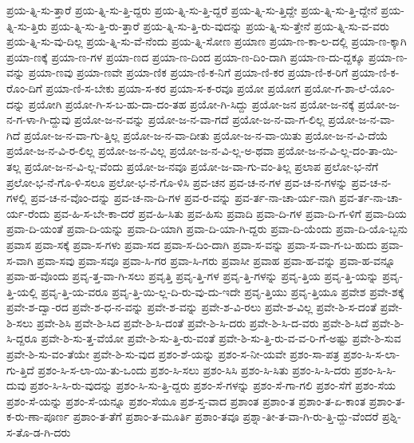 {ಪ್ರಯ-ತ್ನಿ-ಸು-ತ್ತಾರೆ
ಪ್ರಯ-ತ್ನಿ-ಸು-ತ್ತಿ-ದ್ದರು
ಪ್ರಯ-ತ್ನಿ-ಸು-ತ್ತಿ-ದ್ದರೆ
ಪ್ರಯ-ತ್ನಿ-ಸು-ತ್ತಿದ್ದೇ
ಪ್ರಯ-ತ್ನಿ-ಸು-ತ್ತಿ-ದ್ದೇನೆ
ಪ್ರಯ-ತ್ನಿ-ಸು-ತ್ತಿರು
ಪ್ರಯ-ತ್ನಿ-ಸು-ತ್ತಿ-ರು-ತ್ತಾರೆ
ಪ್ರಯ-ತ್ನಿ-ಸು-ತ್ತಿ-ರು-ವುದನ್ನು
ಪ್ರಯ-ತ್ನಿ-ಸು-ತ್ತೇನೆ
ಪ್ರಯ-ತ್ನಿ-ಸು-ವ-ವರು
ಪ್ರಯ-ತ್ನಿ-ಸು-ವು-ದಿಲ್ಲ
ಪ್ರಯ-ತ್ನಿ-ಸು-ವೆ-ನೆಂದು
ಪ್ರಯ-ತ್ನಿ-ಸೋಣ
ಪ್ರಯಾಣ
ಪ್ರಯಾ-ಣ-ಕಾ-ಲ-ದಲ್ಲಿ
ಪ್ರಯಾ-ಣ-ಕ್ಕಾಗಿ
ಪ್ರಯಾ-ಣಕ್ಕೆ
ಪ್ರಯಾ-ಣ-ಗಳ
ಪ್ರಯಾ-ಣದ
ಪ್ರಯಾ-ಣ-ದಿಂದ
ಪ್ರಯಾ-ಣ-ದಿಂ-ದಾಗಿ
ಪ್ರಯಾ-ಣ-ದು-ದ್ದಕ್ಕೂ
ಪ್ರಯಾ-ಣ-ವನ್ನು
ಪ್ರಯಾ-ಣವು
ಪ್ರಯಾ-ಣವೇ
ಪ್ರಯಾ-ಣಿಕ
ಪ್ರಯಾ-ಣಿ-ಕ-ನಿಗೆ
ಪ್ರಯಾ-ಣಿ-ಕರ
ಪ್ರಯಾ-ಣಿ-ಕ-ರಿಗೆ
ಪ್ರಯಾ-ಣಿ-ಕ-ರೊಂ-ದಿಗೆ
ಪ್ರಯಾ-ಣಿ-ಸ-ಬೇಕು
ಪ್ರಯಾ-ಸ-ಕರ
ಪ್ರಯಾ-ಸ-ಕ-ರವೂ
ಪ್ರಯೋ
ಪ್ರಯೋಗ
ಪ್ರಯೋ-ಗ-ಶಾ-ಲೆ-ಯೊಂ-ದನ್ನು
ಪ್ರಯೋಗಿ
ಪ್ರಯೋ-ಗಿ-ಸ-ಬ-ಹು-ದಾ-ದಂ-ತಹ
ಪ್ರಯೋ-ಗಿ-ಸಿದ್ದು
ಪ್ರಯೋ-ಜನ
ಪ್ರಯೋ-ಜ-ನಕ್ಕೆ
ಪ್ರಯೋ-ಜ-ನ-ಗ-ಳಾ-ಗಿ-ದ್ದುವು
ಪ್ರಯೋ-ಜ-ನ-ವನ್ನು
ಪ್ರಯೋ-ಜ-ನ-ವಾ-ಗದೆ
ಪ್ರಯೋ-ಜ-ನ-ವಾ-ಗ-ಲಿಲ್ಲ
ಪ್ರಯೋ-ಜ-ನ-ವಾ-ಗಿದೆ
ಪ್ರಯೋ-ಜ-ನ-ವಾ-ಗು-ತ್ತಿಲ್ಲ
ಪ್ರಯೋ-ಜ-ನ-ವಾ-ದೀತು
ಪ್ರಯೋ-ಜ-ನ-ವಾ-ಯಿತು
ಪ್ರಯೋ-ಜ-ನ-ವಿ-ದೆಯೆ
ಪ್ರಯೋ-ಜ-ನ-ವಿ-ರ-ಲಿಲ್ಲ
ಪ್ರಯೋ-ಜ-ನ-ವಿಲ್ಲ
ಪ್ರಯೋ-ಜ-ನ-ವಿ-ಲ್ಲ-ಅ-ಥವಾ
ಪ್ರಯೋ-ಜ-ನ-ವಿ-ಲ್ಲ-ದಂ-ತಾ-ಯಿ-ತಲ್ಲ
ಪ್ರಯೋ-ಜ-ನ-ವಿ-ಲ್ಲ-ವೆಂದು
ಪ್ರಯೋ-ಜ-ನವೂ
ಪ್ರಯೋ-ಜ-ವಾ-ಗು-ವಂ-ತಿಲ್ಲ
ಪ್ರಲಾಪ
ಪ್ರಲೋ-ಭ-ನೆಗೆ
ಪ್ರಲೋ-ಭ-ನೆ-ಗೊ-ಳಿ-ಸಲೂ
ಪ್ರಲೋ-ಭ-ನೆ-ಗೊ-ಳಿಸಿ
ಪ್ರವ-ಚನ
ಪ್ರವ-ಚ-ನ-ಗಳ
ಪ್ರವ-ಚ-ನ-ಗಳನ್ನು
ಪ್ರವ-ಚ-ನ-ಗಳಲ್ಲಿ
ಪ್ರವ-ಚ-ನ-ವೊಂ-ದನ್ನು
ಪ್ರವ-ಚ-ನಾ-ದಿ-ಗಳ
ಪ್ರವ-ರ-ವನ್ನು
ಪ್ರವ-ರ್ತ-ನಾ-ಚಾ-ರ್ಯ-ನಾಗಿ
ಪ್ರವ-ರ್ತ-ನಾ-ಚಾ-ರ್ಯ-ರೆಂದು
ಪ್ರವ-ಹಿ-ಸ-ಬೇ-ಕಾ-ದರೆ
ಪ್ರವ-ಹಿ-ಸಿತು
ಪ್ರವ-ಹಿಸು
ಪ್ರವಾದಿ
ಪ್ರವಾ-ದಿ-ಗಳ
ಪ್ರವಾ-ದಿ-ಗ-ಳಿಗೆ
ಪ್ರವಾ-ದಿಯ
ಪ್ರವಾ-ದಿ-ಯಂತೆ
ಪ್ರವಾ-ದಿ-ಯನ್ನು
ಪ್ರವಾ-ದಿ-ಯಾಗಿ
ಪ್ರವಾ-ದಿ-ಯಾ-ಗಿ-ದ್ದರು
ಪ್ರವಾ-ದಿ-ಯೆಂದು
ಪ್ರವಾ-ದಿ-ಯೊ-ಬ್ಬನು
ಪ್ರವಾಸ
ಪ್ರವಾ-ಸಕ್ಕೆ
ಪ್ರವಾ-ಸ-ಗಳು
ಪ್ರವಾ-ಸದ
ಪ್ರವಾ-ಸ-ದಿಂ-ದಾಗಿ
ಪ್ರವಾ-ಸ-ವನ್ನು
ಪ್ರವಾ-ಸ-ವಾ-ಗ-ಬ-ಹುದು
ಪ್ರವಾ-ಸ-ವಾಗಿ
ಪ್ರವಾ-ಸವು
ಪ್ರವಾ-ಸವೂ
ಪ್ರವಾ-ಸಿ-ಗರ
ಪ್ರವಾ-ಸಿ-ಗರು
ಪ್ರವಾಸೀ
ಪ್ರವಾಹ
ಪ್ರವಾ-ಹ-ವನ್ನು
ಪ್ರವಾ-ಹ-ವನ್ನೂ
ಪ್ರವಾ-ಹ-ವೊಂದು
ಪ್ರವೃ-ತ್ತ-ವಾ-ಗಿ-ಸಲು
ಪ್ರವೃತ್ತಿ
ಪ್ರವೃ-ತ್ತಿ-ಗಳ
ಪ್ರವೃ-ತ್ತಿ-ಗಳನ್ನು
ಪ್ರವೃ-ತ್ತಿಯ
ಪ್ರವೃ-ತ್ತಿ-ಯನ್ನು
ಪ್ರವೃ-ತ್ತಿ-ಯಲ್ಲಿ
ಪ್ರವೃ-ತ್ತಿ-ಯ-ವರೂ
ಪ್ರವೃ-ತ್ತಿ-ಯಿ-ಲ್ಲ-ದಿ-ರು-ವು-ದು-ಇದೇ
ಪ್ರವೃ-ತ್ತಿಯು
ಪ್ರವೃ-ತ್ತಿಯೂ
ಪ್ರವೇಶ
ಪ್ರವೇ-ಶಕ್ಕೆ
ಪ್ರವೇ-ಶ-ದ್ವಾ-ರದ
ಪ್ರವೇ-ಶ-ಧ-ನ-ವನ್ನು
ಪ್ರವೇ-ಶ-ವನ್ನು
ಪ್ರವೇ-ಶ-ವಿ-ರಲು
ಪ್ರವೇ-ಶ-ವಿಲ್ಲ
ಪ್ರವೇ-ಶಿ-ಸ-ದಂತೆ
ಪ್ರವೇ-ಶಿ-ಸಲು
ಪ್ರವೇ-ಶಿಸಿ
ಪ್ರವೇ-ಶಿ-ಸಿದ
ಪ್ರವೇ-ಶಿ-ಸಿ-ದಂತೆ
ಪ್ರವೇ-ಶಿ-ಸಿ-ದರು
ಪ್ರವೇ-ಶಿ-ಸಿ-ದ-ವರು
ಪ್ರವೇ-ಶಿ-ಸಿದೆ
ಪ್ರವೇ-ಶಿ-ಸಿ-ದ್ದರೂ
ಪ್ರವೇ-ಶಿ-ಸು-ತ್ತ-ವೆಯೋ
ಪ್ರವೇ-ಶಿ-ಸು-ತ್ತಿ-ರು-ವಂತೆ
ಪ್ರವೇ-ಶಿ-ಸು-ತ್ತಿ-ರು-ವ-ವ-ರಿ-ಗೆ-ಅಷ್ಟು
ಪ್ರವೇ-ಶಿ-ಸುವ
ಪ್ರವೇ-ಶಿ-ಸು-ವಂ-ತೆಯೇ
ಪ್ರವೇ-ಶಿ-ಸು-ವುದ
ಪ್ರಶಂ-ಶೆ-ಯನ್ನು
ಪ್ರಶಂ-ಸ-ನೀ-ಯವೇ
ಪ್ರಶಂ-ಸಾ-ಪತ್ರ
ಪ್ರಶಂ-ಸಿ-ಸ-ಲಾ-ಗು-ತ್ತಿದೆ
ಪ್ರಶಂ-ಸಿ-ಸ-ಲಾ-ಯಿ-ತು-ಒಂದು
ಪ್ರಶಂ-ಸಿ-ಸಲು
ಪ್ರಶಂ-ಸಿಸಿ
ಪ್ರಶಂ-ಸಿ-ಸಿತು
ಪ್ರಶಂ-ಸಿ-ಸಿ-ದರು
ಪ್ರಶಂ-ಸಿ-ಸಿ-ದುವು
ಪ್ರಶಂ-ಸಿ-ಸಿ-ರು-ವುದನ್ನು
ಪ್ರಶಂ-ಸಿ-ಸು-ತ್ತಿ-ದ್ದರು
ಪ್ರಶಂ-ಸೆ-ಗಳನ್ನು
ಪ್ರಶಂ-ಸೆ-ಗಾ-ಗಲಿ
ಪ್ರಶಂ-ಸೆಗೆ
ಪ್ರಶಂ-ಸೆಯ
ಪ್ರಶಂ-ಸೆ-ಯನ್ನು
ಪ್ರಶಂ-ಸೆ-ಯನ್ನೂ
ಪ್ರಶಂ-ಸೆಯೂ
ಪ್ರಶ-ಸ್ತ-ವಾದ
ಪ್ರಶಾಂತ
ಪ್ರಶಾಂ-ತ
ಪ್ರಶಾಂ-ತ-ಏ-ಕಾಂತ
ಪ್ರಶಾಂ-ತ-ಕ-ರು-ಣಾ-ಪೂರ್ಣ
ಪ್ರಶಾಂ-ತ-ತೆಗೆ
ಪ್ರಶಾಂ-ತ-ಮೂರ್ತಿ
ಪ್ರಶಾಂ-ತವೂ
ಪ್ರಶ್ನಾ-ತೀ-ತ-ವಾ-ಗಿ-ರು-ತ್ತಿ-ದ್ದು-ವೆಂದರೆ
ಪ್ರಶ್ನಿ-ಸ-ತೊ-ಡ-ಗಿ-ದರು
}
